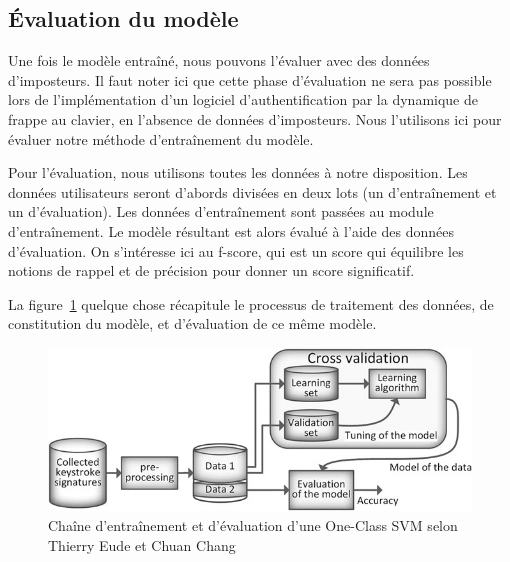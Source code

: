 \subsection{Évaluation du modèle}

Une fois le modèle entraîné, nous pouvons l'évaluer avec des données d'imposteurs. Il faut noter ici que cette phase d'évaluation ne sera pas possible lors de l'implémentation d'un logiciel d'authentification par la dynamique de frappe au clavier, en l'absence de données d'imposteurs. Nous l'utilisons ici pour évaluer notre méthode d'entraînement du modèle.

Pour l'évaluation, nous utilisons toutes les données à notre disposition. Les données utilisateurs seront d'abords divisées en deux lots (un d'entraînement et un d'évaluation). Les données d'entraînement sont passées au module d'entraînement. Le modèle résultant est alors évalué à l'aide des données d'évaluation. On s'intéresse ici au f-score, qui est un score qui équilibre les notions de rappel et de précision pour donner un score significatif.

La figure~\ref{ocsvm} quelque chose récapitule le processus de traitement des données, de constitution du modèle, et d'évaluation de ce même modèle.

\begin{figure}[]
    \centering
    \includegraphics[width=\linewidth]{res/ocsvm.png}
    \caption{Chaîne d'entraînement et d'évaluation d'une One-Class SVM selon Thierry Eude et Chuan Chang\cite{doi:10.1111/coin.12122}}
    \label{ocsvm}
\end{figure}
